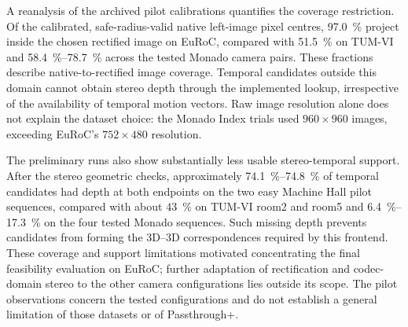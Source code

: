 A reanalysis of the archived pilot calibrations quantifies the coverage
restriction. Of the calibrated, safe-radius-valid native left-image pixel
centres, \SI{97.0}{\percent} project inside the chosen rectified image on
EuRoC, compared with \SI{51.5}{\percent} on TUM-VI and
\SIrange{58.4}{78.7}{\percent} across the tested Monado camera pairs.
These fractions describe native-to-rectified image coverage. Temporal
candidates outside this domain cannot obtain stereo depth through the
implemented lookup, irrespective of the availability of temporal motion
vectors. Raw image resolution alone does not explain the dataset choice:
the Monado Index trials used $960\times960$ images, exceeding EuRoC's
$752\times480$ resolution.

The preliminary runs also show substantially less usable stereo-temporal
support. After the stereo geometric checks, approximately
\SIrange{74.1}{74.8}{\percent} of temporal candidates had depth at both
endpoints on the two easy Machine Hall pilot sequences, compared with about
\SI{43}{\percent} on TUM-VI room2 and room5 and
\SIrange{6.4}{17.3}{\percent} on the four tested Monado sequences. Such
missing depth prevents candidates from forming the 3D--3D correspondences
required by this frontend. These coverage and support limitations motivated
concentrating the final feasibility evaluation on EuRoC; further adaptation
of rectification and codec-domain stereo to the other camera configurations
lies outside its scope. The pilot observations concern the tested
configurations and do not establish a general limitation of those datasets
or of Passthrough+.

